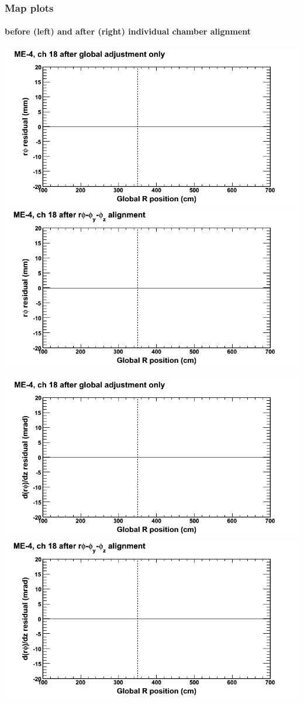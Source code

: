 \documentclass[compress]{beamer}
\begin{document}
\begin{frame}
\frametitle{Map plots}
\framesubtitle{before (left) and after (right) individual chamber alignment}
\includegraphics[width=0.5\linewidth]{ringmapplots_3dof/before_CSCvsr_mem4ch18_x.png} \includegraphics[width=0.5\linewidth]{ringmapplots_3dof/after_CSCvsr_mem4ch18_x.png}

\includegraphics[width=0.5\linewidth]{ringmapplots_3dof/before_CSCvsr_mem4ch18_dxdz.png} \includegraphics[width=0.5\linewidth]{ringmapplots_3dof/after_CSCvsr_mem4ch18_dxdz.png}
\end{frame}
\end{document}

